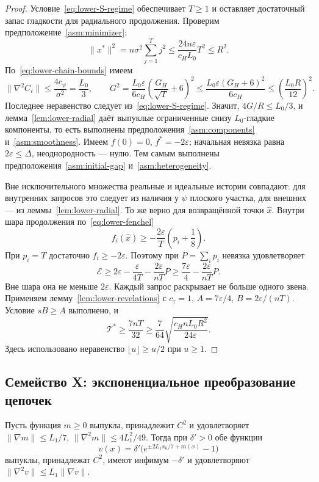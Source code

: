 \begin{proof}
Условие~\eqref{eq:lower-S-regime} обеспечивает $T\ge1$ и оставляет
достаточный запас гладкости для радиального продолжения.
Проверим предположение~\ref{asm:minimizer}:
\[
 \|x^\ast\|^2=n\sigma^2\sum_{j=1}^Tj^2
 \le\frac{24n\varepsilon}{c_HL_0}T^2\le R^2.
\]
По~\eqref{eq:lower-chain-bounds} имеем
\[
 \|\nabla^2C_i\|\le\frac{4c_\psi}{\sigma^2}=\frac{L_0}{3},\qquad
 G^2=\frac{L_0\varepsilon}{6c_H}
       \left(\frac{G_H}{\sqrt T}+6\right)^2
 \le\frac{L_0\varepsilon(G_H+6)^2}{6c_H}
 \le\left(\frac{L_0R}{12}\right)^2.
\]
Последнее неравенство следует из~\eqref{eq:lower-S-regime}.
Значит, $4G/R\le L_0/3$, и лемма~\ref{lem:lower-radial}
даёт выпуклые ограниченные снизу $L_0$-гладкие компоненты,
то есть выполнены предположения~\ref{asm:components} и~\ref{asm:smoothness}.
Имеем $f(0)=0$, $f^\ast=-2\varepsilon$;
начальная невязка равна $2\varepsilon\le\Delta$, неоднородность --- нулю.
Тем самым выполнены предположения~\ref{asm:initial-gap} и~\ref{asm:heterogeneity}.

Вне исключительного множества реальные и идеальные истории совпадают:
для внутренних запросов это следует из наличия у $\psi$ плоского участка,
для внешних --- из леммы~\ref{lem:lower-radial}.
То же верно для возвращённой точки $\hat x$.
Внутри шара продолжения по~\eqref{eq:lower-fenchel}
\[
 f_i(\hat x)\ge-\frac{2\varepsilon}{T}\left(p_i+\frac18\right).
\]
При $p_i=T$ достаточно $f_i\ge-2\varepsilon$.
Поэтому при $P=\sum_i p_i$ невязка удовлетворяет
\[
 \mathcal E\ge2\varepsilon-\frac{\varepsilon}{4T}
 -\frac{2\varepsilon}{nT}P
 \ge\frac{7\varepsilon}{4}-\frac{2\varepsilon}{nT}P.
\]
Вне шара она не меньше $2\varepsilon$.
Каждый запрос раскрывает не больше одного звена.
Применяем лемму~\ref{lem:lower-revelations} с
$c_\tau=1$, $A=7\varepsilon/4$, $B=2\varepsilon/(nT)$.
Условие $sB\ge A$ выполнено, и
\[
 \mathcal T^\ast\ge\frac{7nT}{32}
 \ge\frac7{64}\sqrt{\frac{c_HnL_0R^2}{24\varepsilon}}.
\]
Здесь использовано неравенство $\lfloor u\rfloor\ge u/2$ при $u\ge1$.
\end{proof}

\subsection{Семейство X: экспоненциальное преобразование цепочек}

\begin{lemma}\label{lem:lower-lift}
Пусть функция $m\ge0$ выпукла, принадлежит $C^2$ и удовлетворяет
$\|\nabla m\|\le L_1/7$, $\|\nabla^2m\|\le4L_1^2/49$.
Тогда при $\delta'>0$ обе функции
\[
 v(x)=\delta'\bigl(e^{\pm2L_1x_0/7+m(x)}-1\bigr)
\]
выпуклы, принадлежат $C^2$, имеют инфимум $-\delta'$
и удовлетворяют $\|\nabla^2v\|\le L_1\|\nabla v\|$.
\end{lemma}

